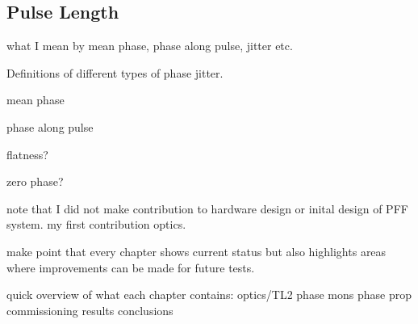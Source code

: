 \subsection{Pulse Length}
\label{ss:pulseLength}


what I mean by mean phase, phase along pulse, jitter etc.

Definitions of different types of phase jitter.


mean phase

phase along pulse

flatness?

zero phase?



note that I did not make contribution to hardware design or inital design of PFF system. my first contribution optics.

make point that every chapter shows current status but also highlights areas where improvements can be made for future tests.

quick overview of what each chapter contains:
optics/TL2
phase mons
phase prop
commissioning
results
conclusions



